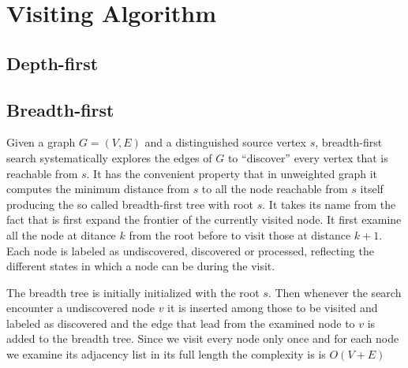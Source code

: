 \section{Visiting Algorithm}


\subsection{Depth-first}

\subsection{Breadth-first}

Given a graph $G = (V,E)$ and a distinguished source vertex $s$, breadth-first
search systematically explores the edges of $G$ to “discover” every vertex that is
reachable from $s$. It has the convenient property that in unweighted graph it computes the minimum distance from $s$ to all the node reachable from $s$ itself producing the so called breadth-first tree with root $s$. It takes its name from the fact that is first expand the frontier of the currently visited node. It first examine all the node at ditance $k$ from the root before to visit those at distance $k+1$.
Each node is labeled as undiscovered, discovered or processed, reflecting the different states in which a node can be during the visit.

The breadth tree is initially initialized with the root $s$. Then whenever the search encounter a undiscovered node $v$ it is inserted among those to be visited and labeled as discovered and the edge that lead from the examined node to $v$ is added to the breadth tree. Since we visit every node only once and for each node we examine its adjacency list in its full length the complexity is is $O(V+E)$


